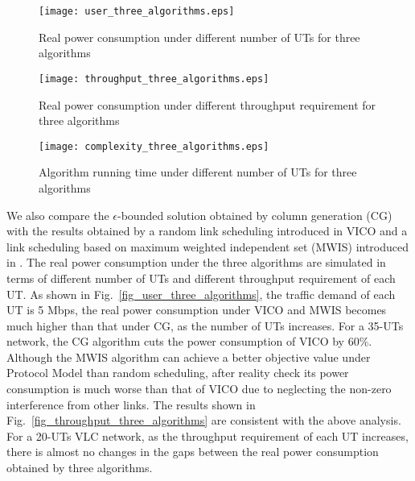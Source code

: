 \documentclass[10pt,journal]{IEEEtran}
\begin{document}
\begin{figure*}
  \centering
  \begin{minipage}[t]{.327\linewidth}
    \texttt{[image: user\_three\_algorithms.eps]}
  \vspace{-10pt}
  \caption{Real power consumption under different number of UTs for three algorithms}
  \vspace{-2pt}
  \label{fig_user_three_algorithms}
  \end{minipage}
  \begin{minipage}[t]{.327\linewidth}
   \texttt{[image: throughput\_three\_algorithms.eps]}
  \vspace{-10pt}
  \caption{Real power consumption under different throughput requirement for three algorithms}
  \vspace{-2pt}
  \label{fig_throughput_three_algorithms}
  \end{minipage}
  \begin{minipage}[t]{.327\linewidth}
    \texttt{[image: complexity\_three\_algorithms.eps]}
  \vspace{-10pt}
  \caption{Algorithm running time under different number of UTs for three algorithms}
  \vspace{-2pt}
  \label{fig_complexity_three_algorithms}
  \end{minipage}
\end{figure*}


We also compare the $\epsilon$-bounded solution obtained by column generation (CG) with the results obtained by a random link scheduling introduced in VICO \cite{li2012vico} and a link scheduling based on maximum weighted independent set (MWIS) introduced in \cite{tao2015scheduling}. The real power consumption under the three algorithms are simulated in terms of different number of UTs and different throughput requirement of each UT. As shown in Fig.~\ref{fig_user_three_algorithms}, the traffic demand of each UT is 5 Mbps, the real power consumption under VICO and MWIS becomes much higher than that under CG, as the number of UTs increases. For a 35-UTs network, the CG algorithm cuts the power consumption of VICO by 60\%. Although the MWIS algorithm can achieve a better objective value under Protocol Model than random scheduling, after reality check its power consumption is much worse than that of VICO due to neglecting the non-zero interference from other links. The results shown in Fig.~\ref{fig_throughput_three_algorithms} are consistent with the above analysis. For a 20-UTs VLC network, as the throughput requirement of each UT increases, there is almost no changes in the gaps between the real power consumption obtained by three algorithms.
\end{document}
